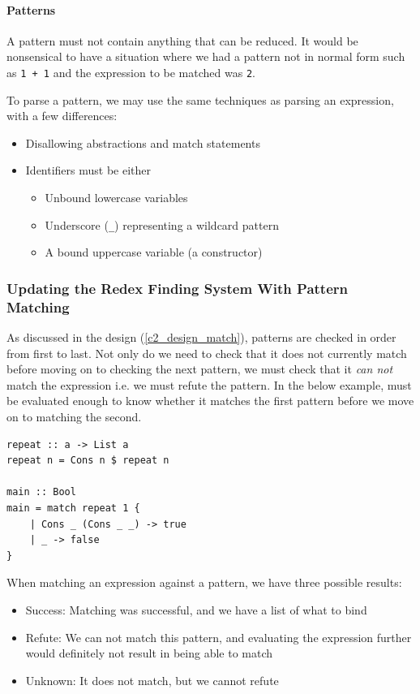 \paragraph{Patterns}
\label{impl:parsing_patterns}
A pattern must not contain anything that can be reduced. It would be nonsensical to have a situation where we had a pattern not in normal form such as \verb|1 + 1| and the expression to be matched was \verb|2|. 

To parse a pattern, we may use the same techniques as parsing an expression, with a few differences:
\begin{itemize}
    \item Disallowing abstractions and match statements
    \item Identifiers must be either
    \begin{itemize}
        \item Unbound lowercase variables
        \item Underscore (\verb|_|) representing a wildcard pattern
        \item A bound uppercase variable (a constructor)
    \end{itemize}
\end{itemize}

\subsubsection{Updating the Redex Finding System With Pattern Matching}
As discussed in the design (\ref{c2_design_match}), patterns are checked in order from first to last. Not only do we need to check that it does not currently match before moving on to checking the next pattern, we must check that it \textit{can not} match the expression i.e. we must refute the pattern. In the below example,  must be evaluated enough to know whether it matches the first pattern before we move on to matching the second. 

\begin{lstlisting}[language=SFL]
repeat :: a -> List a
repeat n = Cons n $ repeat n

main :: Bool
main = match repeat 1 {
    | Cons _ (Cons _ _) -> true
    | _ -> false
}
\end{lstlisting}

When matching an expression against a pattern, we have three possible results:

\begin{itemize}
    \item Success: Matching was successful, and we have a list of what to bind
    \item Refute: We can not match this pattern, and evaluating the expression further would definitely not result in being able to match
    \item Unknown: It does not match, but we cannot refute
\end{itemize}

